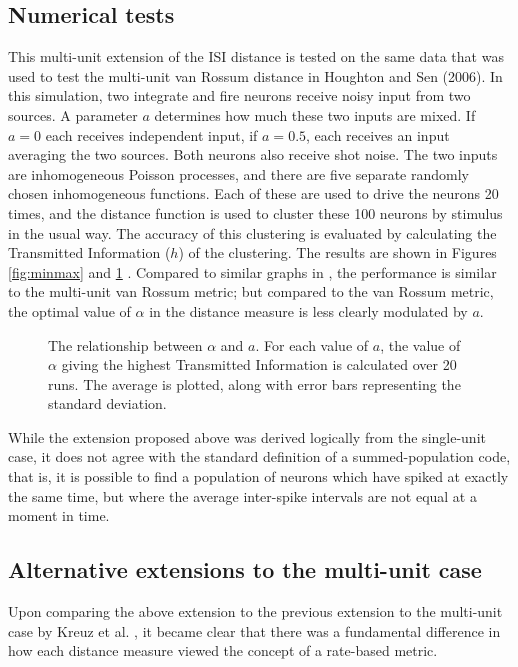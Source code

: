 \documentclass[12pt]{amsart}
\begin{document}
\subsection{Numerical tests}
This multi-unit extension of the ISI distance is tested on the same data that was used to test the multi-unit van Rossum distance in Houghton and Sen (2006).   In this simulation, two integrate and fire neurons receive noisy input from two sources.  A parameter $a$ determines how much these two inputs are mixed.  If $a=0$ each receives independent input, if $a=0.5$, each receives an input averaging the two sources.  Both neurons also receive shot noise.  The two inputs are inhomogeneous Poisson processes, and there are five separate randomly chosen inhomogeneous functions. Each of these are used to drive the neurons 20 times, and the distance function is used to cluster these 100 neurons by stimulus in the usual way.  The accuracy of this clustering is evaluated by calculating the Transmitted Information ($h$) of the clustering.  The results are shown in Figures \ref{fig:minmax} and \ref{fig:bestalpha} . Compared to similar graphs in \cite{HoughtonSen2008}, the performance is similar to the multi-unit van Rossum metric; but compared to the van Rossum metric, the optimal value of $\alpha$ in the distance measure is less clearly modulated by $a$.  


\begin{figure}[thb]
\begin{center}

\end{center}
\caption{ The relationship between $\alpha$ and $a$.  For each value of $a$, the value of $\alpha$ giving the highest Transmitted Information is calculated over 20 runs.  The average is plotted, along with error bars representing the standard deviation.\label{fig:bestalpha} }
\end{figure}

While the extension proposed above was derived logically from the single-unit case, it does not agree with the standard definition of a summed-population code, that is, it is possible to find a population of neurons which have spiked at exactly the same time, but where the average inter-spike intervals are not equal at a moment in time.

\subsection{Alternative extensions to the multi-unit case}

Upon comparing the above extension to the previous extension to the multi-unit case by Kreuz et al. \cite{Kreuzetal2009}, it became clear that there was a fundamental difference in how each distance measure viewed the concept of a rate-based metric.
\end{document}
